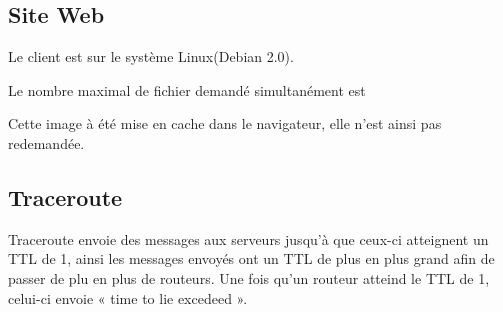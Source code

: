 \documentclass[12pt,a4paper,openany]{article}
\begin{document}
	\subsection{Site Web}
	Le client est sur le système Linux(Debian 2.0). 

	Le nombre maximal de fichier demandé simultanément est 

	Cette image à été mise en cache dans le navigateur, elle n'est ainsi pas redemandée.

	\subsection{Traceroute}
	Traceroute envoie des messages aux serveurs jusqu'à que ceux-ci atteignent un TTL de 1, ainsi les messages envoyés ont un TTL de plus en plus grand
	afin de passer de plu en plus de routeurs. Une fois qu'un routeur atteind le TTL de 1, celui-ci envoie « time to lie excedeed ».

	\appendix
	\listoffigures
	
\end{document}

